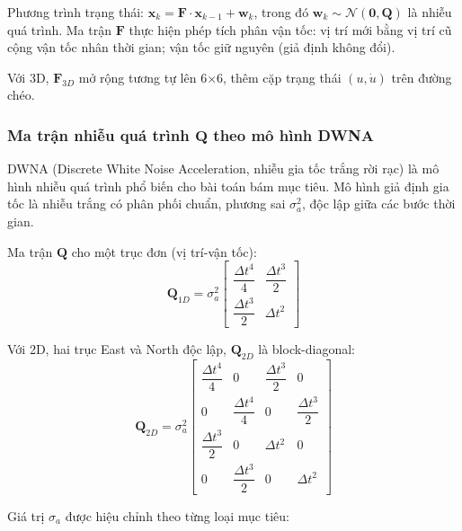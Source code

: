 Phương trình trạng thái: $\mathbf{x}_k = \mathbf{F} \cdot \mathbf{x}_{k-1} + \mathbf{w}_k$, trong đó $\mathbf{w}_k \sim \mathcal{N}(\mathbf{0}, \mathbf{Q})$ là nhiễu quá trình. Ma trận $\mathbf{F}$ thực hiện phép tích phân vận tốc: vị trí mới bằng vị trí cũ cộng vận tốc nhân thời gian; vận tốc giữ nguyên (giả định không đổi).

Với 3D, $\mathbf{F}_{3D}$ mở rộng tương tự lên 6×6, thêm cặp trạng thái $(u, \dot{u})$ trên đường chéo.

\subsubsection{Ma trận nhiễu quá trình \texorpdfstring{$\mathbf{Q}$}{Q} theo mô hình DWNA}

\hspace{0.5cm} DWNA (Discrete White Noise Acceleration, nhiễu gia tốc trắng rời rạc) là mô hình nhiễu quá trình phổ biến cho bài toán bám mục tiêu. Mô hình giả định gia tốc là nhiễu trắng có phân phối chuẩn, phương sai $\sigma_a^2$, độc lập giữa các bước thời gian.

Ma trận $\mathbf{Q}$ cho một trục đơn (vị trí-vận tốc):
\begin{equation}
    \mathbf{Q}_{1D} = \sigma_a^2 \begin{bmatrix}
        \dfrac{\Delta t^4}{4} & \dfrac{\Delta t^3}{2} \\[6pt]
        \dfrac{\Delta t^3}{2} & \Delta t^2
    \end{bmatrix}
\end{equation}

Với 2D, hai trục East và North độc lập, $\mathbf{Q}_{2D}$ là block-diagonal:
\begin{equation}
    \mathbf{Q}_{2D} = \sigma_a^2 \begin{bmatrix}
        \dfrac{\Delta t^4}{4} & 0 & \dfrac{\Delta t^3}{2} & 0 \\[6pt]
        0 & \dfrac{\Delta t^4}{4} & 0 & \dfrac{\Delta t^3}{2} \\[6pt]
        \dfrac{\Delta t^3}{2} & 0 & \Delta t^2 & 0 \\[6pt]
        0 & \dfrac{\Delta t^3}{2} & 0 & \Delta t^2
    \end{bmatrix}
\end{equation}

Giá trị $\sigma_a$ được hiệu chỉnh theo từng loại mục tiêu:

\begin{table}[H]
\centering
\caption{Tham số $\sigma_a$ theo loại mục tiêu}
\label{tab:sigma-a}
\end{table}

